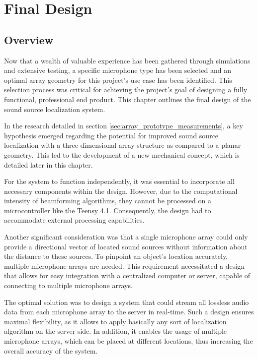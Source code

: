 \chapter{Final Design}
\section{Overview}
Now that a wealth of valuable experience has been gathered through simulations and extensive testing,
a specific microphone type has been selected and an optimal array geometry for this project's use case has been identified.
This selection process was critical for achieving the project's goal of designing a fully functional, professional end product.
This chapter outlines the final design of the sound source localization system.

In the research detailed in section \ref{sec:array_prototype_measurements},
a key hypothesis emerged regarding the potential for improved sound source localization with a three-dimensional array structure as compared to a planar geometry.
This led to the development of a new mechanical concept, which is detailed later in this chapter.

For the system to function independently, it was essential to incorporate all necessary components within the design.
However, due to the computational intensity of beamforming algorithms, they cannot be processed on a microcontroller like the Teensy 4.1.
Consequently, the design had to accommodate external processing capabilities.

Another significant consideration was that a single microphone array could only provide a directional vector of located sound sources without information about the distance to these sources.
To pinpoint an object's location accurately, multiple microphone arrays are needed.
This requirement necessitated a design that allows for easy integration with a centralized computer or server, capable of connecting to multiple microphone arrays.

The optimal solution was to design a system that could stream all lossless audio data from each microphone array to the server in real-time.
Such a design ensures maximal flexibility, as it allows to apply basically any sort of localization algorithm on the server side.
In addition, it enables the usage of multiple microphone arrays, which can be placed at different locations, thus increasing the overall accuracy of the system.
\newpage

